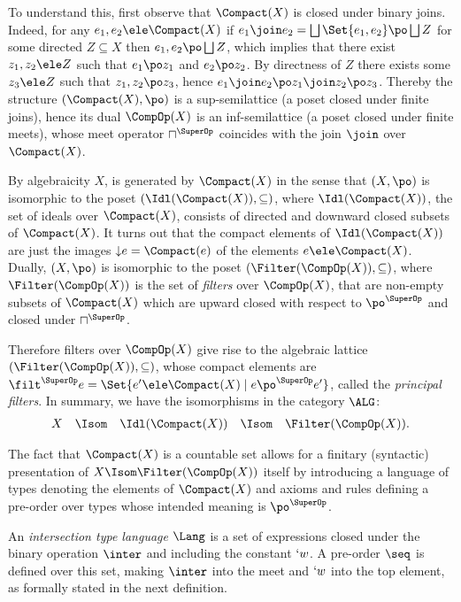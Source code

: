 \documentclass{lmcs}
\begin{document}
To understand this, first observe that $\Compact(X)$ is closed under binary joins. 
Indeed, for any $e_1,e_2 \ele \Compact(X)$ if $e_1 \join e_2 = \bigsqcup \Set{e_1, e_2} \po \bigsqcup Z$ for some directed $Z\subseteq X$ then $e_1,e_2 \po \bigsqcup Z$, which implies that there exist $z_1,z_2\ele Z$ such that $e_1 \po z_1$ and $e_2 \po z_2$. 
By directness of $Z$ there exists some $z_3 \ele Z$ such that $z_1,z_2 \po z_3$, hence
$e_1 \join e_2 \po z_1 \join z_2 \po z_3$. 
Thereby the structure $(\Compact(X), \po)$ is a sup-semilattice (a poset closed under finite joins), hence its dual $\CompOp(X)$ is an inf-semilattice (a poset closed under finite meets), whose meet operator $\sqcap^{\SuperOp}$ coincides with the join $\join$ over $\Compact(X)$.

By algebraicity $X$, is generated by $\Compact(X)$ in the sense that $(X,\po)$ is isomorphic to the poset $(\Idl(\Compact(X)),\subseteq)$, where
$\Idl(\Compact(X))$, the set of ideals over $\Compact(X)$, consists of directed and downward closed subsets of $\Compact(X)$. It turns out that the compact elements of $\Idl(\Compact(X))$ 
are just the images ${\downarrow} e = \Compact(e)$ of the elements $e \ele \Compact(X)$. 
Dually, $(X,\po)$ is isomorphic to the poset $(\Filter(\CompOp(X)),\subseteq)$, where $\Filter(\CompOp(X))$ is the set of \emph{filters} over $\CompOp(X)$, that are non-empty subsets of $\Compact(X)$ which are upward closed with respect to $\po^{\SuperOp}$ and closed under $\sqcap^{\SuperOp}$. 

Therefore filters over $\CompOp(X)$ give rise to the algebraic lattice $(\Filter(\CompOp(X)),\subseteq)$, whose
compact elements are $\filt^{\SuperOp} e = \Set{e' \ele \Compact(X) \mid e\po^{\SuperOp} e'}$, called the \emph{principal filters}. 
In summary, we have the isomorphisms in the category $\ALG$:
%
 \[ \begin{array}{rcccl}
X &\Isom& \Idl(\Compact(X)) &\Isom& \Filter(\CompOp(X)) .
 \end{array} \]

The fact that $\Compact(X)$ is a countable set allows for a finitary (syntactic) presentation
of $X\Isom \Filter(\CompOp(X))$ itself by introducing a language of types denoting the elements of $\Compact(X)$ and axioms and rules defining a pre-order over types whose intended meaning is $\po^{\SuperOp}$.

An \emph{intersection type language} $\Lang$ is a set of expressions closed under the binary operation $\inter$ and including the constant $`w$. 
A pre-order $\seq$ is defined over this set, making $\inter$ into the meet and $`w$ into the top element, as formally stated in the next definition.
\end{document}
